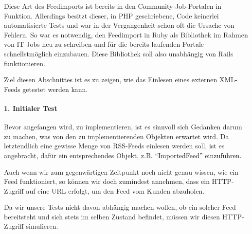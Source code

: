 Diese Art des Feedimports ist bereits in den Community-Job-Portalen in Funktion. Allerdings besitzt dieser, in PHP geschriebene, Code keinerlei automatisierte Tests und war in der Vergangenheit schon oft die Ursache von Fehlern. So war es notwendig, den Feedimport in Ruby als Bibliothek im Rahmen von IT-Jobs neu zu schreiben und für die bereits laufenden Portale schnellstmöglich einzubauen.
Diese Bibliothek soll also unabhängig von Rails funktionieren.

Ziel diesen Abschnittes ist es zu zeigen, wie das Einlesen eines externen XML-Feeds getestet werden kann.

\paragraph{1. Initialer Test}

Bevor angefangen wird, zu implementieren, ist es sinnvoll sich Gedanken darum zu machen, was von den zu implementierenden Objekten erwartet wird. Da letztendlich eine gewisse Menge von RSS-Feeds einlesen werden soll, ist es angebracht, dafür ein entsprechendes Objekt, z.B. "`ImportedFeed"' einzuführen.

Auch wenn wir zum gegenwärtigen Zeitpunkt noch nicht genau wissen, wie ein Feed funktioniert, so können wir doch zumindest annehmen, dass ein HTTP-Zugriff auf eine URL erfolgt, um den Feed vom Kunden abzuholen.

Da wir unsere Tests nicht davon abhängig machen wollen, ob ein solcher Feed bereitsteht und sich stets im selben Zustand befindet, müssen wir diesen HTTP-Zugriff simulieren.

\begin{ruby}[label=test/test\_imported\_feed.rb]
    
  

   

    
\end{ruby}





